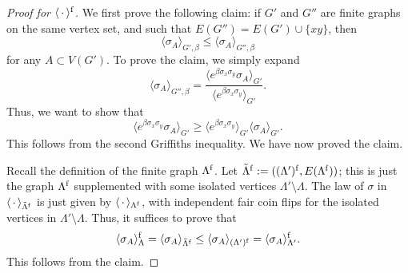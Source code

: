\begin{proof}[Proof for $\langle\,\cdot\,\rangle^{\operatorname{f}}$]
    We first prove the following claim:
    if $G'$ and $G''$ are finite graphs on the same vertex set,
    and such that $E(G'')=E(G')\cup\{xy\}$,
    then
    \[
        \langle\sigma_A\rangle_{G',\beta}
        \leq
        \langle\sigma_A\rangle_{G'',\beta}
    \]
    for any $A\subset V(G')$.
    To prove the claim, we simply expand
    \[
        \langle\sigma_A\rangle_{G'',\beta}
        =
        \frac{
            \langle   e^{\beta\sigma_x\sigma_y}\sigma_A\rangle_{G'}
        }{
            \langle e^{\beta\sigma_x\sigma_y}\rangle_{G'}
        }.
    \]
    Thus, we want to show that
    \[
        \langle e^{\beta\sigma_x\sigma_y} \sigma_A \rangle_{G'}
        \geq
        \langle e^{\beta\sigma_x\sigma_y}\rangle_{G'}
        \langle\sigma_A\rangle_{G'}.
    \]
    This follows from the second Griffiths inequality.
    We have now proved the claim.

    Recall the definition of the finite graph $\Lambda^{\operatorname{f}}$.
    Let $\tilde\Lambda^{\operatorname{f}}:=((\Lambda')^{\operatorname{f}},E(\Lambda^{\operatorname{f}}))$;
    this is just the graph $\Lambda^{\operatorname{f}}$
    supplemented with some isolated vertices $\Lambda'\setminus\Lambda$.
    The law of $\sigma$ in $\langle\,\cdot\,\rangle_{\tilde\Lambda^{\operatorname{f}}}$
    is just given by $\langle\,\cdot\,\rangle_{\Lambda^{\operatorname{f}}}$,
    with independent fair coin flips for the isolated vertices in $\Lambda'\setminus\Lambda$.
    Thus, it suffices to prove that
    \[
        \langle\sigma_A\rangle^{\operatorname{f}}_{\Lambda}
        =
        \langle\sigma_A\rangle_{\tilde\Lambda^{\operatorname{f}}}
        \leq
        \langle\sigma_A\rangle_{(\Lambda')^{\operatorname{f}}}
        =
        \langle\sigma_A\rangle^{\operatorname{f}}_{\Lambda'}
        .
    \]
    This follows from the claim.
\end{proof}

